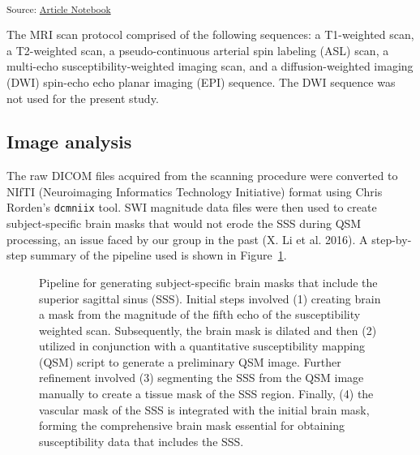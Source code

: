 \documentclass[
sn-nature
]{sn-jnl}
\begin{document}
\textsubscript{Source:
\href{https://WeberLab.github.io/Chisep_CSVO2_Manuscript/index.qmd.html}{Article
Notebook}}

The MRI scan protocol comprised of the following sequences: a
T1-weighted scan, a T2-weighted scan, a pseudo-continuous arterial spin
labeling (ASL) scan, a multi-echo susceptibility-weighted imaging scan,
and a diffusion-weighted imaging (DWI) spin-echo echo planar imaging
(EPI) sequence. The DWI sequence was not used for the present study.

\subsection{Image analysis}\label{image-analysis}

The raw DICOM files acquired from the scanning procedure were converted
to NIfTI (Neuroimaging Informatics Technology Initiative) format using
Chris Rorden's \texttt{dcmniix} tool. SWI magnitude data files were then
used to create subject-specific brain masks that would not erode the SSS
during QSM processing, an issue faced by our group in the past (X. Li et
al. 2016). A step-by-step summary of the pipeline used is shown in
Figure~\ref{fig-graph}.

\begin{figure}[H]


\caption{\label{fig-graph}Pipeline for generating subject-specific brain
masks that include the superior sagittal sinus (SSS). Initial steps
involved (1) creating brain a mask from the magnitude of the fifth echo
of the susceptibility weighted scan. Subsequently, the brain mask is
dilated and then (2) utilized in conjunction with a quantitative
susceptibility mapping (QSM) script to generate a preliminary QSM image.
Further refinement involved (3) segmenting the SSS from the QSM image
manually to create a tissue mask of the SSS region. Finally, (4) the
vascular mask of the SSS is integrated with the initial brain mask,
forming the comprehensive brain mask essential for obtaining
susceptibility data that includes the SSS.}

\end{figure}%
\end{document}
